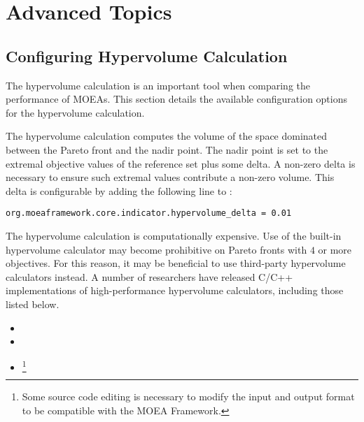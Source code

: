 %
%

\chapter{Advanced Topics}

\section{Configuring Hypervolume Calculation}
The hypervolume calculation is an important tool when comparing the performance of MOEAs.  This section details the available configuration options for the hypervolume calculation.

The hypervolume calculation computes the volume of the space dominated between the Pareto front and the nadir point.  The nadir point is set to the extremal objective values of the reference set plus some delta.  A non-zero delta is necessary to ensure such extremal values contribute a non-zero volume.  This delta is configurable by adding the following line to :

\begin{lstlisting}[language=Plaintext]
org.moeaframework.core.indicator.hypervolume_delta = 0.01
\end{lstlisting}

The hypervolume calculation is computationally expensive.  Use of the built-in hypervolume calculator may become prohibitive on Pareto fronts with $4$ or more objectives.  For this reason, it may be beneficial to use third-party hypervolume calculators instead.  A number of researchers have released C/C++ implementations of high-performance hypervolume calculators, including those listed below.

\begin{itemize}
  \item {}
  \item {}
  \item {}\footnote{Some source code editing is necessary to modify the input and output format to be compatible with the MOEA Framework.}
\end{itemize}

